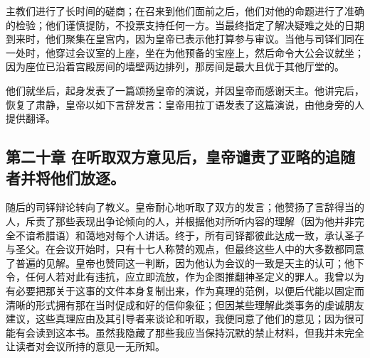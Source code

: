 主教们进行了长时间的磋商；在召来到他们面前之后，他们对他的命题进行了准确的检验；他们谨慎提防，不投票支持任何一方。当最终指定了解决疑难之处的日期到来时，他们聚集在皇宫内，因为皇帝已表示他打算参与审议。当他与司铎们同在一处时，他穿过会议室的上座，坐在为他预备的宝座上，然后命令大公会议就坐；因为座位已沿着宫殿房间的墙壁两边排列，那房间是最大且优于其他厅堂的。\par

他们就坐后，起身发表了一篇颂扬皇帝的演说，并因皇帝而感谢天主。他讲完后，恢复了肃静，皇帝以如下言辞发言：皇帝用拉丁语发表了这篇演说，由他身旁的人提供翻译。\par


\subsection{第二十章  在听取双方意见后，皇帝谴责了亚略的追随者并将他们放逐。}

随后的司铎辩论转向了教义。皇帝耐心地听取了双方的发言；他赞扬了言辞得当的人，斥责了那些表现出争论倾向的人，并根据他对所听内容的理解（因为他并非完全不谙希腊语）和蔼地对每个人讲话。终于，所有司铎都彼此达成一致，承认圣子与圣父。在会议开始时，只有十七人称赞的观点，但最终这些人中的大多数都同意了普遍的见解。皇帝也赞同这一判断，因为他认为会议的一致是天主的认可；他下令，任何人若对此有违抗，应立即流放，作为企图推翻神圣定义的罪人。我曾以为有必要把那关于这事的文件本身复制出来，作为真理的范例，以便后代能以固定而清晰的形式拥有那在当时促成和好的信仰象征；但因某些理解此类事务的虔诚朋友建议，这些真理应由及其引导者来谈论和听取，我便同意了他们的意见；因为很可能有会读到这本书。虽然我隐藏了那些我应当保持沉默的禁止材料，但我并未完全让读者对会议所持的意见一无所知。\par

